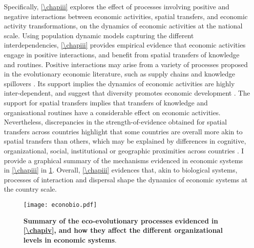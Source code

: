 Specifically, \cref{\chapiii} explores the effect of processes involving positive and negative interactions between economic activities, spatial transfers, and economic activity transformations, on the dynamics of economic activities at the national scale.
% 
% 
Using population dynamic models capturing the different interdependencies, \cref{\chapiii} provides empirical evidence that economic activities engage in positive interactions, and benefit from spatial transfers of knowledge and routines.
% 
Positive interactions may arise from a variety of processes proposed in the evolutionary economic literature, such as supply chains \citep{Ozman2009,Saavedra2009a} and knowledge spillovers \citep{Menon2015}. 
% 
Its support implies the dynamics of economic activities are highly inter-dependent, and suggest that diversity promotes economic development \citep{Hidalgo2018}.
% 
The support for spatial transfers implies that transfers of knowledge and organisational routines \citep{Zahra2000,Zahra2000,RogersEverettM2003DoI,Boschma2008} have a considerable effect on economic activities. Nevertheless, discrepancies in the strength-of-evidence obtained for spatial transfers across countries highlight that some countries are overall more akin to spatial transfers than others, which may be explained by differences in cognitive, organizational, social, institutional or geographic proximities across countries \citep{Boschma2005}.
% 
I provide a graphical summary of the mechanisms evidenced in economic systems in \cref{\chapiii} in \cref{fig:summary_econobio}. Overall, \cref{\chapiii} evidences that, akin to biological systems, processes of interaction and dispersal shape the dynamics of economic systems at the country scale.

\begin{figure}[t]
    \centering
    \texttt{[image: econobio.pdf]}
    \caption{\textbf{Summary of the eco-evolutionary processes evidenced in \cref{\chapiv}, and how they affect the different organizational levels in economic systems}.}
    \label{fig:summary_econobio}
\end{figure}

% 

